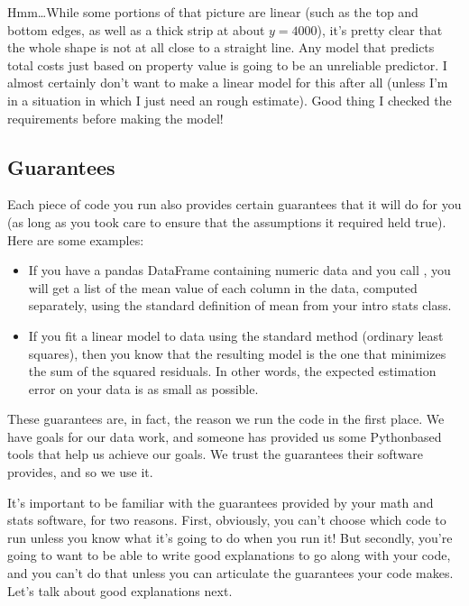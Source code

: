 \documentclass[letterpaper,10pt,english]{sphinxmanual}
\begin{document}
\noindent{}

Hmm…While some portions of that picture are linear (such as the top and bottom edges, as well as a thick strip at about \(y=4000\)), it’s pretty clear that the whole shape is not at all close to a straight line.  Any model that predicts total costs just based on property value is going to be an unreliable predictor.  I almost certainly don’t want to make a linear model for this after all (unless I’m in a situation in which I just need an  rough estimate).  Good thing I checked the requirements before making the model!


\subsection{Guarantees}
\label{\detokenize{chapter-5-before-and-after:guarantees}}
Each piece of code you run also provides certain guarantees that it will do for you (as long as you took care to ensure that the assumptions it required held true).  Here are some examples:
\begin{itemize}
\item {} 
If you have a pandas DataFrame  containing numeric data and you call , you will get a list of the mean value of each column in the data, computed separately, using the standard definition of mean from your intro stats class.

\item {} 
If you fit a linear model to data using the standard method (ordinary least squares), then you know that the resulting model is the one that minimizes the sum of the squared residuals.  In other words, the expected estimation error on your data is as small as possible.

\end{itemize}

These guarantees are, in fact, the reason we run the code in the first place.  We have goals for our data work, and someone has provided us some Python\sphinxhyphen{}based tools that help us achieve our goals.  We trust the guarantees their software provides, and so we use it.

It’s important to be familiar with the guarantees provided by your math and stats software, for two reasons.  First, obviously, you can’t choose which code to run unless you know what it’s going to do when you run it!  But secondly, you’re going to want to be able to write good explanations to go along with your code, and you can’t do that unless you can articulate the guarantees your code makes.  Let’s talk about good explanations next.
\end{document}
